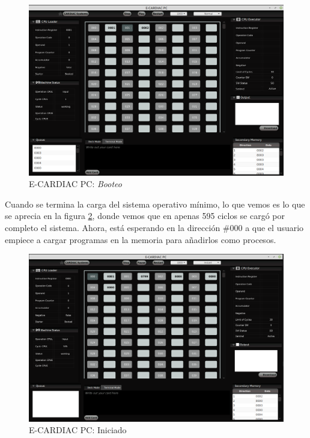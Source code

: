\documentclass[letterpaper,12pt,oneside]{book}
\begin{document}
			
			\begin{figure}[H]		
				\centering
				\includegraphics[scale=0.45]{media/Paralela/ecardiacpc_booteo.png}
				\caption{ E-CARDIAC PC: \textit{Booteo}}
				\label{fig:ecardiacpc_booteo}
			\end{figure}	
			
			
			Cuando se termina la carga del sistema operativo mínimo, lo que vemos es lo que se aprecia en la figura \ref{fig:ecardiacpc_booteado}, donde
			vemos que en apenas 595 ciclos se cargó por completo el sistema. Ahora, está esperando en la dirección \#000 a que el usuario empiece
			a cargar programas en la memoria para añadirlos como procesos.

			\begin{figure}[H]		
				\centering
				\includegraphics[scale=0.45]{media/Paralela/ecardiacpc_booteado.png}
				\caption{ E-CARDIAC PC: Iniciado}
				\label{fig:ecardiacpc_booteado}
			\end{figure}	
\end{document}
